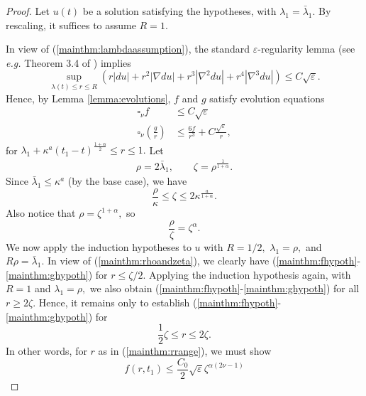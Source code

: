 \documentclass[12pt]{amsart}
\theoremstyle{others}
\numberwithin{equation}{section}
\newcommand{\eps}{\varepsilon}
\begin{document}
\begin{proof}
Let $u(t)$ be a solution satisfying the hypotheses, with $\lambda_1 = \bar{\lambda}_1.$ By rescaling, it suffices to assume $R = 1.$


In view of (\ref{mainthm:lambdaassumption}), %
the standard $\eps$-regularity lemma (see {\it e.g.} Theorem 3.4 of \cite{songwaldron}) implies
$$\sup_{\lambda(t) \leq r \leq R} \left( r |du| + r^2 |\nabla du| + r^3 |\nabla^2 du | + r^4 |\nabla^3 du |\right) \leq C \sqrt{\eps}.$$
Hence, by Lemma \ref{lemma:evolutions}, $f$ and $g$ satisfy evolution equations
\begin{equation*}
\begin{split}
\square_\nu f & \leq C \sqrt{\eps} \\
\square_\nu \left( \frac{g}{r} \right) & \leq \frac{6f}{r^3} + C \frac{\sqrt{\eps} }{r},
\end{split}
\end{equation*}
for $\lambda_1 + \kappa^{a} \left(t_1 - t \right)^{\frac{1 + \alpha}{2}} \leq r \leq 1.$ 
Let
\[
\begin{split}
\rho = 2 \bar{\lambda}_1, \qquad \zeta  = \rho^{\frac{1}{1 + \alpha}}.
\end{split}
\]
Since $\bar{\lambda}_1 \leq \kappa^a$ (by the base case), we have
\begin{equation}\label{mainthm:zetasmallness}
\frac{\rho}{\kappa} \leq \zeta \leq 2\kappa^{\frac{a}{1 + \alpha}}.
\end{equation}
Also notice that $\rho = \zeta^{1 + \alpha},$ so
\begin{equation}\label{mainthm:rhoandzeta}
\frac{\rho}{\zeta} = \zeta^\alpha.
\end{equation}
We now apply the induction hypotheses to $u$ with $R = 1/2,$ $\lambda_1 = \rho,$ and $R \rho = \bar{\lambda}_1.$ %
In view of (\ref{mainthm:rhoandzeta}), we clearly have (\ref{mainthm:fhypoth}-\ref{mainthm:ghypoth}) for $r \leq \zeta / 2.$ Applying the induction hypothesis again, with $R = 1$ and $\lambda_1 = \rho,$ we also obtain (\ref{mainthm:fhypoth}-\ref{mainthm:ghypoth}) for all $r \geq 2 \zeta.$ 
Hence, it remains only to establish (\ref{mainthm:fhypoth}-\ref{mainthm:ghypoth}) for 
\begin{equation}\label{mainthm:rrange}
\frac12 \zeta \leq r \leq 2 \zeta.
\end{equation}
In other words, for $r$ as in (\ref{mainthm:rrange}), we must show
\begin{equation}\label{mainthm:frrangetoshow}
f(r,t_1) \leq \frac{C_0}{2} \sqrt{\eps} \zeta^{\alpha (2 \nu -1)}

\end{equation}
\end{proof}
\end{document}
